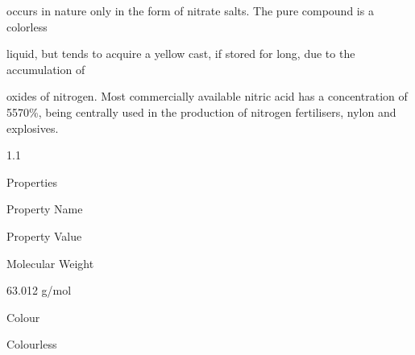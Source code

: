 \documentclass[a4paper,portrait,12pt]{article}
\begin{document}
\begin{flushleft}
occurs in nature only in the form of nitrate salts. The pure compound is a colorless
\end{flushleft}


\begin{flushleft}
liquid, but tends to acquire a yellow cast, if stored for long, due to the accumulation of
\end{flushleft}


\begin{flushleft}
oxides of nitrogen. Most commercially available nitric acid has a concentration of 5570\%, being centrally used in the production of nitrogen fertilisers, nylon and explosives.
\end{flushleft}





1.1





\begin{flushleft}
Properties
\end{flushleft}


\begin{flushleft}
Property Name
\end{flushleft}





\begin{flushleft}
Property Value
\end{flushleft}





\begin{flushleft}
Molecular Weight
\end{flushleft}





\begin{flushleft}
63.012 g/mol
\end{flushleft}





\begin{flushleft}
Colour
\end{flushleft}





\begin{flushleft}
Colourless
\end{flushleft}
\end{document}
